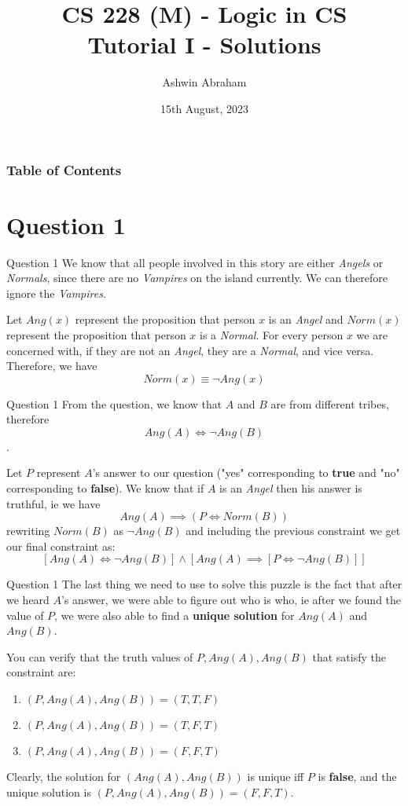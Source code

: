 \documentclass{beamer}
\title[] 
{\textbf{CS 228 (M) - Logic in CS}\\Tutorial I - Solutions}
\author[Ashwin Abraham] 
{Ashwin Abraham}
\institute[] 
{
    IIT Bombay
}
\date[2023]
{15th August, 2023}
\begin{document}
    \frame{\titlepage}

    \begin{frame}
        \frametitle{Table of Contents}
        \tableofcontents    
    \end{frame}

    \section{Question 1}
    {
        \begin{frame}{Question 1}
            We know that all people involved in this story are either \textit{Angels} or \textit{Normals}, since there are no \textit{Vampires} on the island currently. We can therefore ignore the \textit{Vampires}.

            Let $Ang(x)$ represent the proposition that person $x$ is an \textit{Angel} and $Norm(x)$ represent the proposition that person $x$ is a \textit{Normal}. For every person $x$ we are concerned with, if they are not an \textit{Angel}, they are a \textit{Normal}, and vice versa. Therefore, we have $$Norm(x) \equiv \neg Ang(x)$$%
        \end{frame}
        \begin{frame}{Question 1}
            From the question, we know that $A$ and $B$ are from different tribes, therefore $$Ang(A) \iff \neg Ang(B)$$.

            Let $P$ represent $A$'s answer to our question ("yes" corresponding to \textbf{true} and "no" corresponding to \textbf{false}). We know that if $A$ is an \textit{Angel} then his answer is truthful, ie we have $$Ang(A) \implies (P \iff Norm(B))$$rewriting $Norm(B)$ as $\neg Ang(B)$ and including the previous constraint we get our final constraint as:
            \begin{equation*}
                \boxed{\left[Ang(A) \iff \neg Ang(B)\right] \land \left[Ang(A) \implies \left[P \iff \neg Ang(B)\right]\right]}
            \end{equation*}
        \end{frame}
        \begin{frame}{Question 1}
            The last thing we need to use to solve this puzzle is the fact that after we heard $A$'s answer, we were able to figure out who is who, ie after we found the value of $P$, we were also able to find a \textbf{unique solution} for $Ang(A)$ and $Ang(B)$.

            You can verify that the truth values of $P, Ang(A), Ang(B)$ that satisfy the constraint are:
            \begin{enumerate}
                \item $(P, Ang(A), Ang(B)) = (T, T, F)$
                \item $(P, Ang(A), Ang(B)) = (T, F, T)$
                \item $(P, Ang(A), Ang(B)) = (F, F, T)$
            \end{enumerate}
            Clearly, the solution for $(Ang(A), Ang(B))$ is unique iff $P$ is \textbf{false}, and the unique solution is $(P, Ang(A), Ang(B)) = (F, F, T)$.


\end{frame}}
\end{document}
